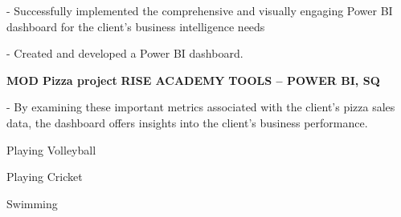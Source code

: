 \documentclass[11pt]{spidercv}
\begin{document}
\begin{MainPart}
{    - Successfully implemented the comprehensive and visually engaging Power BI dashboard for the client's business intelligence needs 

- Created and developed a Power BI dashboard.\\
        
        }
        
    \Projects
        
        
		{\textbf{MOD Pizza project}}
		{\textbf{RISE ACADEMY} }
        {\textbf{TOOLS – POWER BI, SQ}}
        
        {   
            - By examining these important metrics associated with the client's pizza sales data, the dashboard offers insights into the 
client's business performance. 
\\
        }

   
        


    \vspace*{0.5cm}
    \begin{DoubleColumns}
        \begin{ItemList}{\ColorHighlight}
            \item [] Playing Volleyball
            \item [] Playing Cricket
        \end{ItemList}
        \nextcolumn
        \begin{ItemList}{\ColorHighlight}
            \item [] Swimming
        \end{ItemList}
    \end{DoubleColumns}

    \end{MainPart}

    
\end{document}
